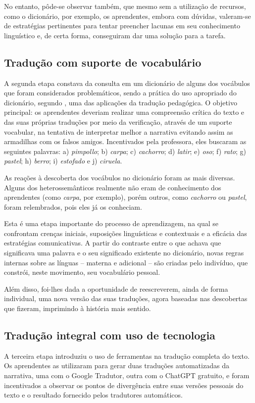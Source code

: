 \documentclass[portuguese]{textolivre}
\begin{document}
No entanto, pôde-se observar também, que mesmo sem a utilização de recursos, como o dicionário, por exemplo, os aprendentes, embora com dúvidas, valeram-se de estratégias pertinentes para tentar preencher lacunas em seu conhecimento linguístico e, de certa forma, conseguiram dar uma solução para a tarefa.

\subsection{Tradução com suporte de vocabulário}\label{sec-4b}
A segunda etapa constava da consulta em um dicionário de alguns dos vocábulos que foram considerados problemáticos, sendo a prática do uso apropriado do dicionário, segundo \textcite{alcarazo2014}, uma das aplicações da tradução pedagógica. O objetivo principal: os aprendentes deveriam realizar uma compreensão crítica do texto e das suas próprias traduções por meio da verificação, através de um suporte vocabular, na tentativa de interpretar melhor a narrativa evitando assim as armadilhas com os falsos amigos. Incentivados pela professora, eles buscaram as seguintes palavras: a) \textit{pimpollo}; b) \textit{carpa}; c) \textit{cachorro}; d) \textit{latir}; e) \textit{oso}; f) \textit{rato}; g) \textit{pastel}; h) \textit{berro}; i) \textit{estofado} e j) \textit{ciruela}.

As reações à descoberta dos vocábulos no dicionário foram as mais diversas. Alguns dos heterossemânticos realmente não eram de conhecimento dos aprendentes (como \textit{carpa}, por exemplo), porém outros, como \textit{cachorro} ou \textit{pastel}, foram relembrados, pois eles já os conheciam.

Esta é uma etapa importante do processo de aprendizagem, na qual se confrontam crenças iniciais, suposições linguísticas e contextuais e a eficácia das estratégias comunicativas. A partir do contraste entre o que achava que significava uma palavra e o seu significado existente no dicionário, novas regras internas sobre as línguas -- materna e adicional -- são criadas pelo indivíduo, que constrói, neste movimento, seu vocabulário pessoal.

Além disso, foi-lhes dada a oportunidade de reescreverem, ainda de forma individual, uma nova versão das suas traduções, agora baseadas nas descobertas que fizeram, imprimindo à história mais sentido.


\subsection{Tradução integral com uso de tecnologia}\label{sec-4c}
A terceira etapa introduziu o uso de ferramentas na tradução completa do texto. Os aprendentes as utilizaram para gerar duas traduções automatizadas da narrativa, uma com o Google Tradutor, outra com o ChatGPT gratuito, e foram incentivados a observar os pontos de divergência entre suas versões pessoais do texto e o resultado fornecido pelos tradutores automáticos.
\end{document}
